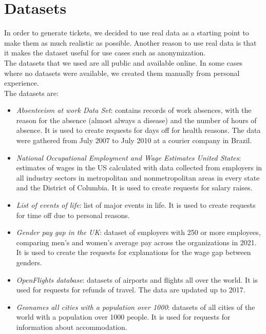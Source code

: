 \section{Datasets}
In order to generate tickets, we decided to use real data as a starting point to make them as much realistic as possible. Another reason to use real data is that it makes the dataset useful for use cases such as anonymization. \\
The datasets that we used are all public and available online. In some cases where no datasets were available, we created them manually from personal experience. \\
The datasets are:
\begin{itemize}
    \item \textit{Absenteeism at work Data Set}: contains records of work absences, with the reason for the absence (almost always a disease) and the number of hours of absence. It is used to create requests for days off for health reasons. The data were gathered from July 2007 to July 2010 at a courier company in Brazil.
    \item \textit{National Occupational Employment and Wage Estimates United States}: estimates of wages in the US calculated with data collected from employers in all industry sectors in metropolitan and nonmetropolitan areas in every state and the District of Columbia. It is used to create requests for salary raises.
    \item \textit{List of events of life}: list of major events in life. It is used to create requests for time off due to personal reasons. 
    \item \textit{Gender pay gap in the UK}: dataset of employers with 250 or more employees, comparing men's and women's average pay across the organizations in 2021. It is used to create the requests for explanations for the wage gap between genders.
    \item \textit{OpenFlights database}: datasets of airports and flights all over the world. It is used for requests for refunds of travel. The data are updated up to 2017.
    \item \textit{Geonames all cities with a population over 1000}: datasets of all cities of the world with a population over 1000 people. It is used for requests for information about accommodation.
\end{itemize}